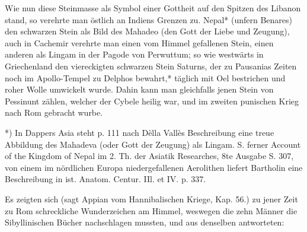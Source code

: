 \documentclass[a4paper, 11pt, oneside, polutonikogreek, german]{article}
\begin{document}
Wie nun diese Steinmasse als Symbol einer Gottheit auf den Spitzen des Libanon stand, so verehrte man östlich an Indiens Grenzen zu. Nepal* (unfern Benares) den schwarzen Stein als Bild des Mahadeo (den Gott der Liebe und Zeugung), auch in Cachemir verehrte man einen vom Himmel gefallenen Stein, einen anderen als Lingam in der Pagode von Perwuttum; so wie westwärts in Griechenland den viereckigten schwarzen Stein Saturns, der zu Pausanias Zeiten noch im Apollo-Tempel zu Delphos bewahrt,* täglich mit Oel bestrichen und roher Wolle umwickelt wurde. Dahin kann man gleichfalls jenen Stein von Pessinunt zählen, welcher der Cybele heilig war, und im zweiten punischen Krieg nach Rom gebracht wurbe.

*) In Dappers Asia steht p. 111 nach Dèlla Vallès Beschreibung eine treue Abbildung des Mahadeva (oder Gott der Zeugung) als Lingam. S. ferner Account of the Kingdom of Nepal im 2. Th. der Asiatik Researches, 8te Ausgabe S. 307, von einem im nördlichen Europa niedergefallenen Aerolithen liefert Bartholin eine Beschreibung in ist. Anatom. Centur. IIl. et IV. p. 337.

Es zeigten sich (sagt Appian vom Hannibalischen Kriege, Kap. 56.) zu jener Zeit zu Rom schreckliche Wunderzeichen am Himmel, weswegen die zehn Männer die Sibyllinischen Bücher nachschlagen mussten, und aus denselben antworteten:
\end{document}
